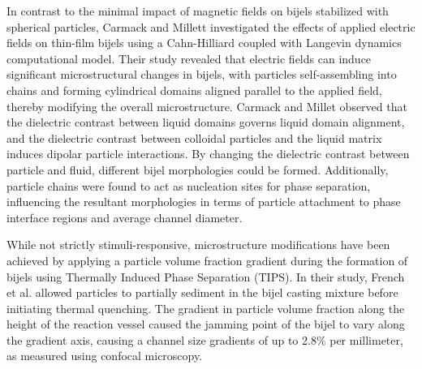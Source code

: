 In contrast to the minimal impact of magnetic fields on bijels stabilized with spherical particles, Carmack and Millett investigated the effects of 
applied electric fields on thin-film bijels using a Cahn-Hilliard coupled with Langevin dynamics computational model. \cite{carmack_tuning_2018} 
Their study revealed that electric fields can induce significant microstructural changes in bijels, with particles self-assembling into chains and forming 
cylindrical domains aligned parallel to the applied field, thereby modifying the overall microstructure. Carmack and Millet observed that the dielectric contrast 
between liquid domains governs liquid domain alignment, and the dielectric contrast between colloidal particles and the liquid matrix induces dipolar particle 
interactions. By changing the dielectric contrast between particle and fluid, different bijel morphologies could be formed. Additionally, particle chains were found to 
act as nucleation sites for phase separation, influencing the resultant morphologies in terms of particle attachment to phase interface regions and average 
channel diameter. 

While not strictly stimuli-responsive, microstructure modifications have been achieved by applying a particle volume fraction gradient during the formation of 
bijels using Thermally Induced Phase Separation (TIPS). \cite{french_bicontinuous_2022} In their study, French et al. allowed particles to partially sediment in the bijel casting mixture
before initiating thermal quenching. The gradient in particle volume fraction along the height of the reaction vessel caused the jamming point of the bijel
to vary along the gradient axis, causing a channel size gradients of up to 2.8\% per millimeter, as measured using confocal microscopy.